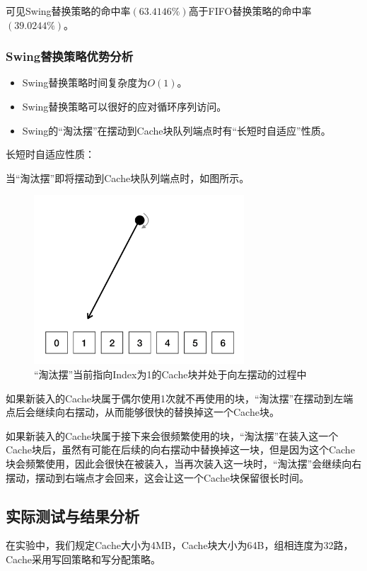 \documentclass{article}
\begin{document}
可见Swing替换策略的命中率$(63.4146\%)$高于FIFO替换策略的命中率$(39.0244\%)$。

\subsubsection{Swing替换策略优势分析}
\begin{itemize}
	\item{Swing替换策略时间复杂度为$O(1)$。}
	\item{Swing替换策略可以很好的应对循环序列访问。}
	\item{Swing的“淘汰摆”在摆动到Cache块队列端点时有“长短时自适应”性质。}
\end{itemize}
长短时自适应性质：

当“淘汰摆”即将摆动到Cache块队列端点时，如图所示。
\begin{figure}[H]
    \centering
    \includegraphics[width=0.7\textwidth]{pic5.png}
    \caption{“淘汰摆”当前指向Index为1的Cache块并处于向左摆动的过程中}
\end{figure}
如果新装入的Cache块属于偶尔使用1次就不再使用的块，“淘汰摆”在摆动到左端点后会继续向右摆动，从而能够很快的替换掉这一个Cache块。

如果新装入的Cache块属于接下来会很频繁使用的块，“淘汰摆”在装入这一个Cache块后，虽然有可能在后续的向右摆动中替换掉这一块，但是因为这个Cache块会频繁使用，因此会很快在被装入，当再次装入这一块时，“淘汰摆”会继续向右摆动，摆动到右端点才会回来，这会让这一个Cache块保留很长时间。


\subsection{实际测试与结果分析}

在实验中，我们规定Cache大小为4MB，Cache块大小为64B，组相连度为32路，Cache采用写回策略和写分配策略。
\end{document}

